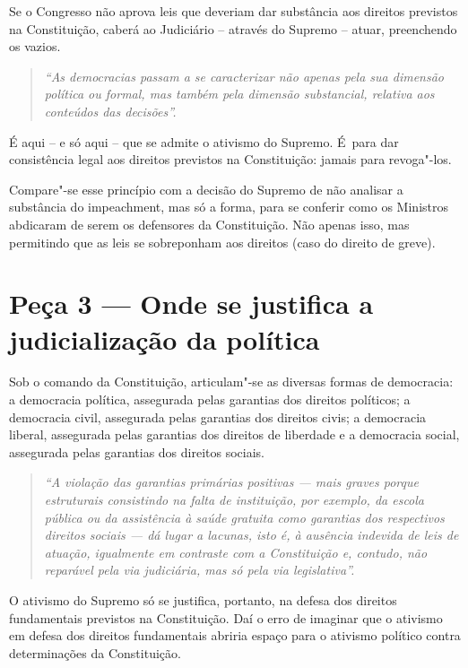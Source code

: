 Se o Congresso não aprova leis que deveriam dar substância aos direitos
previstos na Constituição, caberá ao Judiciário -- através do Supremo --
atuar, preenchendo os vazios.

\begin{quote}
\emph{``As democracias passam a se caracterizar não apenas pela sua
dimensão política ou formal, mas também pela dimensão substancial,
relativa aos conteúdos das decisões''.}
\end{quote}

É aqui -- e só aqui -- que se admite o ativismo do Supremo. É~para dar
consistência legal aos direitos previstos na Constituição: jamais para
revoga"-los.

Compare"-se esse princípio com a decisão do Supremo de não analisar a
substância do impeachment, mas só a forma, para se conferir como os
Ministros abdicaram de serem os defensores da Constituição. Não apenas
isso, mas permitindo que as leis se sobreponham aos direitos (caso do
direito de greve).

\section{Peça 3 --- Onde se justifica a judicialização da política}

Sob o comando da Constituição, articulam"-se as diversas formas de
democracia:~ a democracia política, assegurada pelas garantias dos
direitos políticos; a democracia civil, assegurada pelas garantias dos
direitos civis; a democracia liberal, assegurada pelas garantias dos
direitos de liberdade e a democracia social, assegurada pelas garantias
dos direitos sociais.

\begin{quote}
\emph{``A violação das garantias primárias positivas --- mais graves
porque estruturais consistindo na falta de instituição, por exemplo, da
escola pública ou da assistência à saúde gratuita como garantias dos
respectivos direitos sociais --- dá lugar a lacunas, isto é, à ausência
indevida de leis de atuação, igualmente em contraste com a Constituição
e, contudo, não reparável pela via judiciária, mas só pela via
legislativa''.}
\end{quote}

O ativismo do Supremo só se justifica, portanto, na defesa dos direitos
fundamentais previstos na Constituição. Daí o erro de imaginar que o
ativismo em defesa dos direitos fundamentais abriria espaço para o
ativismo político contra determinações da Constituição.

